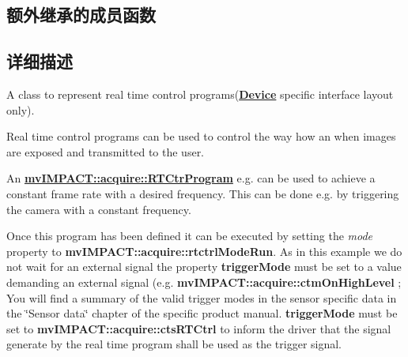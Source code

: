 \subsection*{额外继承的成员函数}


\subsection{详细描述}
A class to represent real time control programs({\bfseries \hyperlink{classmv_i_m_p_a_c_t_1_1acquire_1_1_device}{Device}} specific interface layout only). 

Real time control programs can be used to control the way how an when images are exposed and transmitted to the user.

An {\bfseries \hyperlink{classmv_i_m_p_a_c_t_1_1acquire_1_1_r_t_ctr_program}{mv\+I\+M\+P\+A\+C\+T\+::acquire\+::\+R\+T\+Ctr\+Program}} e.\+g. can be used to achieve a constant frame rate with a desired frequency. This can be done e.\+g. by triggering the camera with a constant frequency.

Once this program has been defined it can be executed by setting the {\itshape mode} property to {\bfseries mv\+I\+M\+P\+A\+C\+T\+::acquire\+::rtctrl\+Mode\+Run}. As in this example we do not wait for an external signal the property {\bfseries trigger\+Mode} must be set to a value demanding an external signal (e.\+g. {\bfseries mv\+I\+M\+P\+A\+C\+T\+::acquire\+::ctm\+On\+High\+Level} ; You will find a summary of the valid trigger modes in the sensor specific data in the \char`\"{}\+Sensor data\char`\"{} chapter of the specific product manual. {\bfseries trigger\+Mode} must be set to {\bfseries mv\+I\+M\+P\+A\+C\+T\+::acquire\+::cts\+R\+T\+Ctrl} to inform the driver that the signal generate by the real time program shall be used as the trigger signal.

